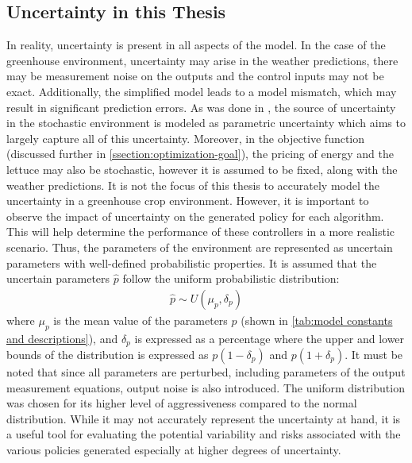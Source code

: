 \subsection{Uncertainty in this Thesis}
In reality, uncertainty is present in all aspects of the model. In the case of the greenhouse environment, uncertainty may arise in the weather predictions, there may be measurement noise on the outputs and the control inputs may not be exact. Additionally, the simplified model leads to a model mismatch, which may result in significant prediction errors.  As was done in \cite{boersmaRobustSamplebasedModel2022, lubbersAutonomousGreenhouseClimate2023}, the source of uncertainty in the stochastic environment is modeled as parametric uncertainty which aims to largely capture all of this uncertainty. Moreover, in the objective function (discussed further in \autoref{ssection:optimization-goal}), the pricing of energy and the lettuce may also be stochastic, however it is assumed to be fixed, along with the weather predictions.
It is not the focus of this thesis to accurately model the uncertainty in a greenhouse crop environment. However, it is important to observe the impact of uncertainty on the generated policy for each algorithm. This will help determine the performance of these controllers in a more realistic scenario. Thus, the parameters of the environment are represented as uncertain parameters with well-defined probabilistic properties. It is assumed that the uncertain parameters $\hat{p}$ follow the uniform probabilistic distribution:
\begin{equation}
	\label{eq:uncertainty_model}
	\begin{aligned}
		\hat{p} \sim U(\mu_p, \delta_p)  
	\end{aligned}
\end{equation}
where $\mu_p$ is the mean value of the parameters $p$ (shown in \autoref{tab:model constants and descriptions}), and $\delta_p$ is expressed as a percentage where the upper and lower bounds of the distribution is expressed as $p(1-\delta_p)$ and $p(1+\delta_p)$. It must be noted that since all parameters are perturbed, including parameters of the output measurement equations, output noise is also introduced. The uniform distribution was chosen for its higher level of aggressiveness compared to the normal distribution. While it may not accurately represent the uncertainty at hand, it is a useful tool for evaluating the potential variability and risks associated with the various policies generated especially at higher degrees of uncertainty.


